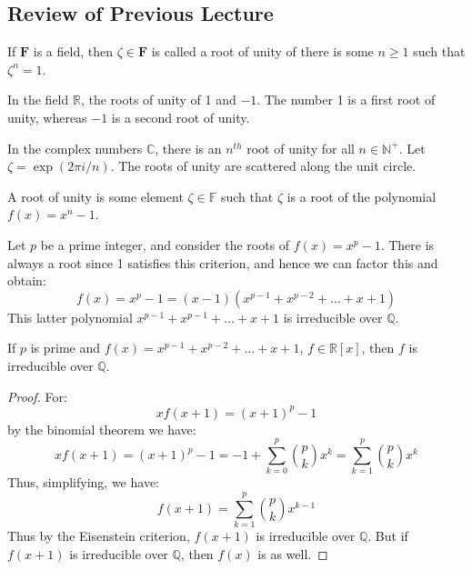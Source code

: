     \subsection{Review of Previous Lecture}
        If $\mathbf{F}$ is a field, then $\zeta\in\mathbf{F}$ is called a
        root of unity of there is some $n\geq{1}$ such that $\zeta^{n}=1$.
        \begin{example}
            In the field $\mathbb{R}$, the roots of unity of 1 and
            $\minus{1}$. The number 1 is a first root of unity, whereas
            $\minus{1}$ is a second root of unity.
        \end{example}
        \begin{example}
            In the complex numbers $\mathbb{C}$, there is an $n^{th}$ root
            of unity for all $n\in\mathbb{N}^{+}$. Let
            $\zeta=\exp(2\pi{i}/n)$. The roots of unity are scattered along
            the unit circle.
        \end{example}
        A root of unity is some element $\zeta\in\mathbb{F}$ such that
        $\zeta$ is a root of the polynomial $f(x)=x^{n}-1$.
        \begin{example}
            Let $p$ be a prime integer, and consider the roots of
            $f(x)=x^{p}-1$. There is always a root since 1 satisfies this
            criterion, and hence we can factor this and obtain:
            \begin{equation}
                f(x)=x^{p}-1=(x-1)(x^{p-1}+x^{p-2}+\dots+x+1)
            \end{equation}
            This latter polynomial $x^{p-1}+x^{p-1}+\dots+x+1$ is
            irreducible over $\mathbb{Q}$.
        \end{example}
        \begin{theorem}
            If $p$ is prime and $f(x)=x^{p-1}+x^{p-2}+\dots+x+1$,
            $f\in\mathbb{R}[x]$, then $f$ is irreducible over $\mathbb{Q}$.
        \end{theorem}
        \begin{proof}
            For:
            \begin{equation}
                xf(x+1)=(x+1)^{p}-1
            \end{equation}
            by the binomial theorem we have:
            \begin{equation}
                xf(x+1)=(x+1)^{p}-1=
                \minus{1}+\sum_{k=0}^{p}\binom{p}{k}x^{k}
                =\sum_{k=1}^{p}\binom{p}{k}x^{k}
            \end{equation}
            Thus, simplifying, we have:
            \begin{equation}
                f(x+1)=\sum_{k=1}^{p}\binom{p}{k}x^{k-1}
            \end{equation}
            Thus by the Eisenstein criterion, $f(x+1)$ is irreducible over
            $\mathbb{Q}$. But if $f(x+1)$ is irreducible over $\mathbb{Q}$,
            then $f(x)$ is as well.
        \end{proof}

